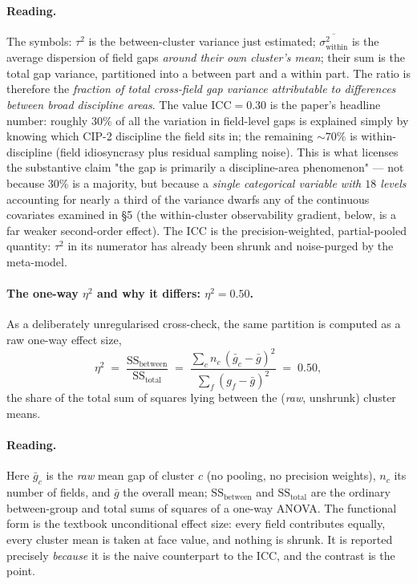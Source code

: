 \documentclass[11pt]{article}
\begin{document}
\paragraph{Reading.} The symbols: $\tau^2$ is the between-cluster variance just estimated; $\overline{\sigma^2_{\text{within}}}$ is the average dispersion of field gaps \emph{around their own cluster's mean}; their sum is the total gap variance, partitioned into a between part and a within part. The ratio is therefore the \emph{fraction of total cross-field gap variance attributable to differences between broad discipline areas}. The value $\mathrm{ICC}=0.30$ is the paper's headline number: roughly $30\%$ of all the variation in field-level gaps is explained simply by knowing which CIP-2 discipline the field sits in; the remaining $\sim 70\%$ is within-discipline (field idiosyncrasy plus residual sampling noise). This is what licenses the substantive claim "the gap is primarily a discipline-area phenomenon" --- not because $30\%$ is a majority, but because a \emph{single categorical variable with $18$ levels} accounting for nearly a third of the variance dwarfs any of the continuous covariates examined in \S5 (the within-cluster observability gradient, below, is a far weaker second-order effect). The ICC is the precision-weighted, partial-pooled quantity: $\tau^2$ in its numerator has already been shrunk and noise-purged by the meta-model.

\paragraph{The one-way $\eta^2$ and why it differs: $\eta^2 = 0.50$.} As a deliberately unregularised cross-check, the same partition is computed as a raw one-way effect size,
\[
\eta^2 \;=\; \frac{\mathrm{SS}_{\text{between}}}{\mathrm{SS}_{\text{total}}} \;=\; \frac{\sum_{c} n_c\,(\bar{g}_c-\bar{g})^2}{\sum_{f}(g_f-\bar{g})^2} \;=\; 0.50,
\]
the share of the total sum of squares lying between the (\emph{raw}, unshrunk) cluster means.

\paragraph{Reading.} Here $\bar{g}_c$ is the \emph{raw} mean gap of cluster $c$ (no pooling, no precision weights), $n_c$ its number of fields, and $\bar{g}$ the overall mean; $\mathrm{SS}_{\text{between}}$ and $\mathrm{SS}_{\text{total}}$ are the ordinary between-group and total sums of squares of a one-way ANOVA. The functional form is the textbook unconditional effect size: every field contributes equally, every cluster mean is taken at face value, and nothing is shrunk. It is reported precisely \emph{because} it is the naive counterpart to the ICC, and the contrast is the point.
\end{document}
